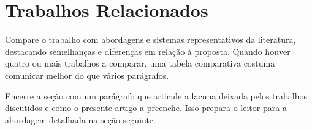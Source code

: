 \section{Trabalhos Relacionados}
\label{sec:relacionados}

Compare o trabalho com abordagens e sistemas representativos da literatura,
destacando semelhanças e diferenças em relação à proposta. Quando houver quatro
ou mais trabalhos a comparar, uma tabela comparativa costuma comunicar melhor do
que vários parágrafos.

Encerre a seção com um parágrafo que articule a lacuna deixada pelos trabalhos
discutidos e como o presente artigo a preenche. Isso prepara o leitor para a
abordagem detalhada na seção seguinte.
